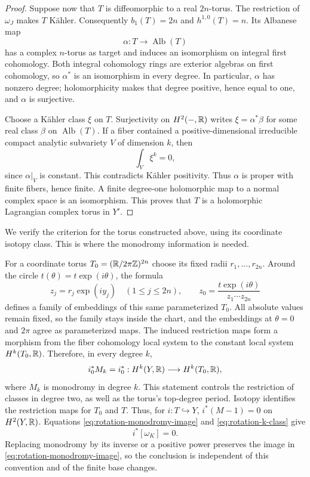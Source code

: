\begin{proof}
Suppose now that $T$ is diffeomorphic to a real $2n$-torus. The
restriction of $\omega_J$ makes $T$ K\"ahler.
Consequently $b_1(T)=2n$ and $h^{1,0}(T)=n$.  Its Albanese map
\[
                 \alpha:T\longrightarrow\operatorname{Alb}(T)
\]
has a complex $n$-torus as target and induces an isomorphism on
integral first cohomology.  Both integral cohomology rings are
exterior algebras on first cohomology, so $\alpha^*$ is an
isomorphism in every degree.  In particular, $\alpha$ has
nonzero degree; holomorphicity makes that degree positive, hence
equal to one, and $\alpha$ is surjective.

Choose a K\"ahler class $\xi$ on $T$.  Surjectivity on $H^2(-,\mathbb R)$
writes $\xi=\alpha^*\beta$ for some real class $\beta$ on
$\operatorname{Alb}(T)$.  If a fiber contained a positive-dimensional
irreducible compact analytic subvariety $V$ of dimension $k$, then
\[
                        \int_V\xi^k=0,
\]
since $\alpha|_V$ is constant.  This contradicts K\"ahler
positivity.  Thus $\alpha$ is proper with finite fibers, hence
finite.  A finite degree-one holomorphic map to a normal complex
space is an isomorphism.  This proves that $T$ is a holomorphic
Lagrangian complex torus in $Y'$.
\end{proof}

We verify the criterion for the torus constructed above, using its
coordinate isotopy class. This is where the monodromy information is
needed.

For a coordinate torus $T_0=(\mathbb R/2\pi\mathbb Z)^{2n}$ choose its fixed
radii $r_1,\ldots,r_{2n}$.  Around the circle
$t(\theta)=t\exp(i\theta)$, the formula
\[
 z_j=r_j\exp(iy_j)\quad(1\le j\le2n),\qquad
 z_0=\frac{t\exp(i\theta)}{z_1\cdots z_{2n}}
\]
defines a family of embeddings of this same parameterized $T_0$.
All absolute values remain fixed, so the family stays inside the
chart, and the embeddings at $\theta=0$ and $2\pi$ agree as
parameterized maps.  The induced restriction maps form a morphism
from the fiber cohomology local system to the constant local system
$H^k(T_0,\mathbb R)$.  Therefore, in every degree $k$,
\begin{equation}
 i_0^*M_k=i_0^*:H^k(Y,\mathbb R)\longrightarrow H^k(T_0,\mathbb R),
\label{eq:rotation-restriction-monodromy}
\end{equation}
where $M_k$ is monodromy in degree $k$.  This statement controls
the restriction of classes in degree two, as well as the torus's
top-degree period.  Isotopy identifies the restriction maps for
$T_0$ and $T$.  Thus, for $i:T\hookrightarrow Y$,
$i^*(M-1)=0$ on $H^2(Y,\mathbb R)$.  Equations
\eqref{eq:rotation-monodromy-image} and
\eqref{eq:rotation-k-class} give
\begin{equation}
                         i^*[\omega_K]=0.
\label{eq:rotation-k-vanishing}
\end{equation}
Replacing monodromy by its inverse or a positive power preserves
the image in \eqref{eq:rotation-monodromy-image}, so the conclusion
is independent of this convention and of the finite base changes.

